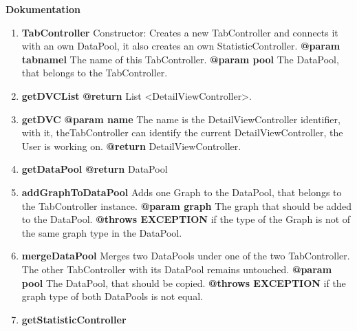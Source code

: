 \textbf{Dokumentation}
\begin{enumerate}[+]
	\item{
	\textbf{TabController} \newline
	Constructor: Creates a new TabController and connects it with an own DataPool, it also creates an own StatisticController. \newline
	\textbf{@param tabnamel} The name of this TabController. \newline
	\textbf{@param pool} The DataPool, that belongs to the TabController. \newline
}
	\item{
	\textbf{getDVCList} \newline
	\textbf{@return} List <DetailViewController>. \newline
}
	\item{
	\textbf{getDVC} \newline
	\textbf{@param name} The name is the DetailViewController identifier, with it, theTabController can \newline
	identify the current DetailViewController, the User is working on. \newline
	\textbf{@return} DetailViewController. \newline
	}
	\item{
	\textbf{getDataPool} \newline
	\textbf{@return} DataPool \newline
}
	\item{
	\textbf{addGraphToDataPool} \newline
	Adds one Graph to the DataPool, that belongs to the TabController instance. \newline
	\textbf{@param graph} The graph that should be added to the DataPool. \newline
	\textbf{@throws EXCEPTION} if the type of the Graph is not of the same graph type in the DataPool. \newline
}
	\item{
	\textbf{mergeDataPool} \newline
	Merges two DataPools under one of the two TabController. The other TabController with its DataPool remains untouched. \newline
	\textbf{@param pool} The DataPool, that should be copied. \newline
	\textbf{@throws EXCEPTION} if the graph type of both DataPools is not equal.
}
	\item{
	\textbf{getStatisticController} \newline
}
\end{enumerate}
